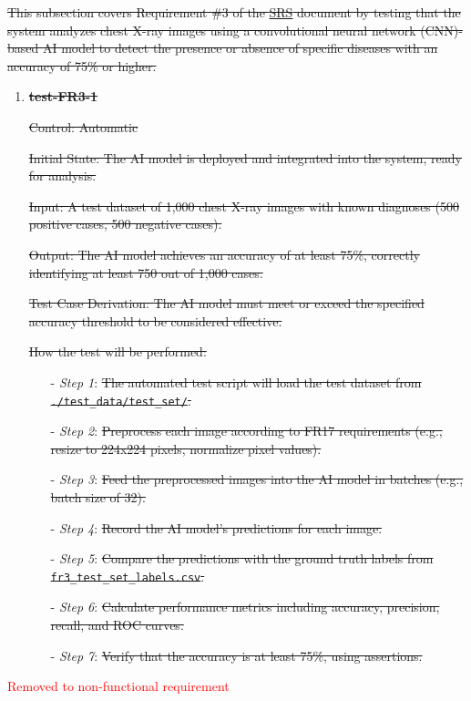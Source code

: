 \documentclass[12pt, titlepage]{article}
\begin{document}
\sout{This subsection covers Requirement \#3 of the \href{https://github.com/RezaJodeiri/CXR-Capstone/blob/main/docs/SRS/SRS.pdf}{SRS} \citep{SRS}
document by testing that the system analyzes chest X-ray images using a convolutional neural network (CNN)-based AI model to detect the presence or absence of specific diseases with an accuracy of 75\% or higher.}

\begin{enumerate}

\item \textbf{\sout{test-FR3-1}} \label{test-FR3-1}

\sout{Control: Automatic}

\sout{Initial State: The AI model is deployed and integrated into the system, ready for analysis.}

\sout{Input: A test dataset of 1,000 chest X-ray images with known diagnoses (500 positive cases, 500 negative cases).}

\sout{Output: The AI model achieves an accuracy of at least 75\%, correctly identifying at least 750 out of 1,000 cases.}

\sout{Test Case Derivation: The AI model must meet or exceed the specified accuracy threshold to be considered effective.}

\sout{How the test will be performed:}
\begin{itemize}
  \item[-] \textit{Step 1}: \sout{The automated test script will load the test dataset from \texttt{./test\_data/test\_set/}.}
  \item[-] \textit{Step 2}: \sout{Preprocess each image according to FR17 requirements (e.g., resize to 224x224 pixels, normalize pixel values).}
  \item[-] \textit{Step 3}: \sout{Feed the preprocessed images into the AI model in batches (e.g., batch size of 32).}
  \item[-] \textit{Step 4}: \sout{Record the AI model's predictions for each image.}
  \item[-] \textit{Step 5}: \sout{Compare the predictions with the ground truth labels from \texttt{fr3\_test\_set\_labels.csv}.}
  \item[-] \textit{Step 6}: \sout{Calculate performance metrics including accuracy, precision, recall, and ROC curves.}
  \item[-] \textit{Step 7}: \sout{Verify that the accuracy is at least 75\%, using assertions.}
\end{itemize}

\end{enumerate}
\textcolor{red}{Removed to non-functional requirement}
\end{document}
